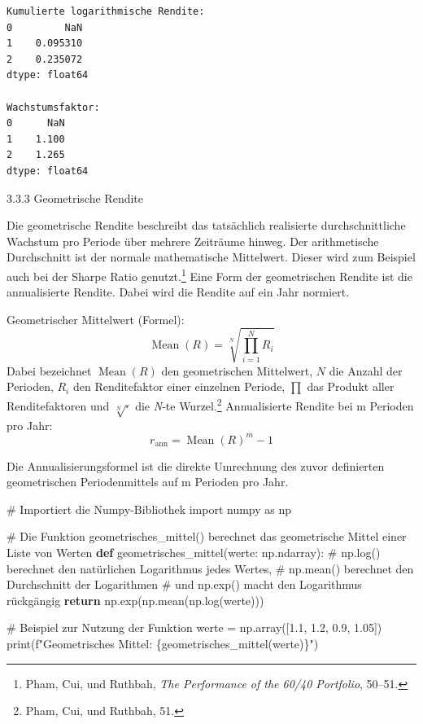 \documentclass[
  ngerman,
  a4paper,
  DIV=11,
  oneside]{scrreprt}
\newenvironment{Shaded}{\begin{snugshade}}{\end{snugshade}}
\newcommand{\BuiltInTok}[1]{\textcolor[rgb]{0.00,0.23,0.31}{#1}}
\newcommand{\CommentTok}[1]{\textcolor[rgb]{0.37,0.37,0.37}{#1}}
\newcommand{\ControlFlowTok}[1]{\textcolor[rgb]{0.00,0.23,0.31}{\textbf{#1}}}
\newcommand{\FloatTok}[1]{\textcolor[rgb]{0.68,0.00,0.00}{#1}}
\newcommand{\ImportTok}[1]{\textcolor[rgb]{0.00,0.46,0.62}{#1}}
\newcommand{\KeywordTok}[1]{\textcolor[rgb]{0.00,0.23,0.31}{\textbf{#1}}}
\newcommand{\NormalTok}[1]{\textcolor[rgb]{0.00,0.23,0.31}{#1}}
\newcommand{\OperatorTok}[1]{\textcolor[rgb]{0.37,0.37,0.37}{#1}}
\newcommand{\SpecialCharTok}[1]{\textcolor[rgb]{0.37,0.37,0.37}{#1}}
\newcommand{\SpecialStringTok}[1]{\textcolor[rgb]{0.13,0.47,0.30}{#1}}
\begin{document}
\begin{verbatim}
Kumulierte logarithmische Rendite:
0         NaN
1    0.095310
2    0.235072
dtype: float64

Wachstumsfaktor:
0      NaN
1    1.100
2    1.265
dtype: float64
\end{verbatim}

3.3.3 Geometrische Rendite

Die geometrische Rendite beschreibt das tatsächlich realisierte
durchschnittliche Wachstum pro Periode über mehrere Zeiträume hinweg.
Der arithmetische Durchschnitt ist der normale mathematische Mittelwert.
Dieser wird zum Beispiel auch bei der Sharpe Ratio genutzt.\footnote{Pham,
  Cui, und Ruthbah, \emph{The {Performance} of the 60/40 {Portfolio}},
  50--51.} Eine Form der geometrischen Rendite ist die annualisierte
Rendite. Dabei wird die Rendite auf ein Jahr normiert.

Geometrischer Mittelwert (Formel): \[
\operatorname{Mean}(R)
=
\sqrt[N]{\prod_{i=1}^{N} R_i}
\] Dabei bezeichnet \textbf{\(\operatorname{Mean}(R)\)} den
geometrischen Mittelwert, \textbf{\(N\)} die Anzahl der Perioden,
\textbf{\(R_i\)} den Renditefaktor einer einzelnen Periode,
\textbf{\(\prod\)} das Produkt aller Renditefaktoren und
\textbf{\(\sqrt[N]{\cdot}\)} die \emph{N}-te Wurzel.\footnote{Pham, Cui,
  und Ruthbah, 51.} Annualisierte Rendite bei m Perioden pro Jahr: \[
r_{\mathrm{ann}}=\operatorname{Mean}(R)^m-1
\]

Die Annualisierungsformel ist die direkte Umrechnung des zuvor
definierten geometrischen Periodenmittels auf m Perioden pro Jahr.

\begin{Shaded}
\begin{Highlighting}[]
\CommentTok{\# Importiert die Numpy{-}Bibliothek}
\ImportTok{import}\NormalTok{ numpy }\ImportTok{as}\NormalTok{ np}

\CommentTok{\# Die Funktion geometrisches\_mittel() berechnet das geometrische Mittel einer Liste von Werten}
\KeywordTok{def}\NormalTok{ geometrisches\_mittel(werte: np.ndarray):}
    \CommentTok{\# np.log() berechnet den natürlichen Logarithmus jedes Wertes,}
    \CommentTok{\# np.mean() berechnet den Durchschnitt der Logarithmen}
    \CommentTok{\# und np.exp() macht den Logarithmus rückgängig}
    \ControlFlowTok{return}\NormalTok{ np.exp(np.mean(np.log(werte)))}

\CommentTok{\# Beispiel zur Nutzung der Funktion}
\NormalTok{werte }\OperatorTok{=}\NormalTok{ np.array([}\FloatTok{1.1}\NormalTok{, }\FloatTok{1.2}\NormalTok{, }\FloatTok{0.9}\NormalTok{, }\FloatTok{1.05}\NormalTok{])}
\BuiltInTok{print}\NormalTok{(}\SpecialStringTok{f"Geometrisches Mittel: }\SpecialCharTok{\{}\NormalTok{geometrisches\_mittel(werte)}\SpecialCharTok{\}}\SpecialStringTok{"}\NormalTok{)}
\end{Highlighting}
\end{Shaded}
\end{document}
